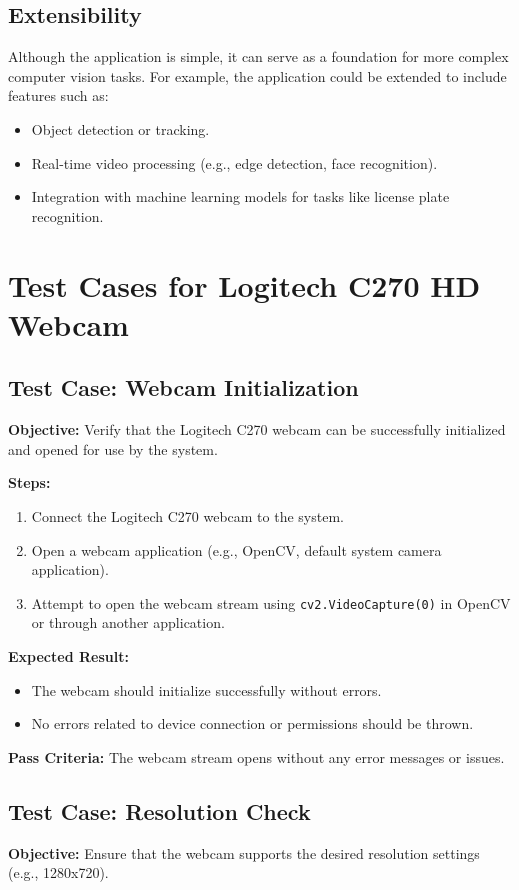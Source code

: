 \subsection*{Extensibility}
Although the application is simple, it can serve as a foundation for more complex computer vision tasks. For example, the application could be extended to include features such as:
\begin{itemize}
	\item Object detection or tracking.
	\item Real-time video processing (e.g., edge detection, face recognition).
	\item Integration with machine learning models for tasks like license plate recognition. \cite{PYI:2016}
	
\end{itemize}

\section{Test Cases for Logitech C270 HD Webcam}
\subsection{Test Case: Webcam Initialization}
\textbf{Objective:} Verify that the Logitech C270 webcam can be successfully initialized and opened for use by the system.

\textbf{Steps:}
\begin{enumerate}
	\item Connect the Logitech C270 webcam to the system.
	\item Open a webcam application (e.g., OpenCV, default system camera application).
	\item Attempt to open the webcam stream using \texttt{cv2.VideoCapture(0)} in OpenCV or through another application.
\end{enumerate}

\textbf{Expected Result:}
\begin{itemize}
	\item The webcam should initialize successfully without errors.
	\item No errors related to device connection or permissions should be thrown.
\end{itemize}

\textbf{Pass Criteria:} 
The webcam stream opens without any error messages or issues.

\subsection{Test Case: Resolution Check}
\textbf{Objective:} Ensure that the webcam supports the desired resolution settings (e.g., 1280x720).

